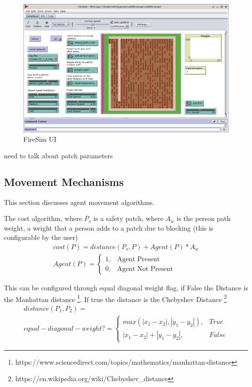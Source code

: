 \documentclass[12pt,letterpaper]{article}
\begin{document}
\begin{figure}
  \includegraphics[width=\linewidth]{./figures/fire_sim_ui.png}
  \caption{FireSim UI}
\end{figure}



need to talk about patch parameters
\subsection{Movement Mechanisms}
This section discusses agent movement algorithms.

The cost algorithm, where $P_s$ is a safety patch, where $A_w$ is the person path weight, a weight that a person adds to a patch due to blocking (this is configurable by the user)
\begin{align}
cost(P)  = distance(P_s, P) + Agent(P) * A_w \nonumber \\
Agent(P)=
\begin{cases}
1, & \text{Agent Present}  \\
0, & \text{Agent Not Present} 
\end{cases}
\end{align}

This can be configured through equal diagonal weight flag. if False the Distance is the Manhattan distance \footnote{ https://www.sciencedirect.com/topics/mathematics/manhattan-distance}. If true the distance is the Chebyshev Distance \footnote{https://en.wikipedia.org/wiki/Chebyshev\_distance}
\begin{align}
distance(P_1, P_2)  = \nonumber\\
equal-diagonal-weight?=
\begin{cases}
	max(|x_1-x_2|, |y_1-y_2|), & True \\
	|x_1-x_2|+ |y_1-y_2|, & False
\end{cases}
\end{align}
\end{document}
